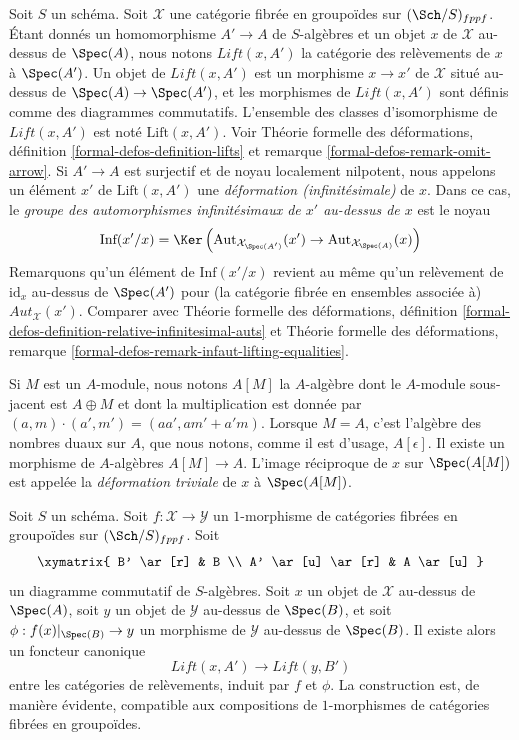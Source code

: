 \medskip\noindent
Soit $S$ un schéma. Soit $\mathcal{X}$ une catégorie fibrée en groupoïdes sur
$(\Sch/S)_{fppf}$. Étant donnés un homomorphisme $A' \to A$ de $S$-algèbres
et un objet $x$ de $\mathcal{X}$ au-dessus de $\Spec(A)$, nous notons
$\textit{Lift}(x, A')$ la catégorie des relèvements de $x$ à $\Spec(A')$.
Un objet de $\textit{Lift}(x, A')$ est un morphisme $x \to x'$ de
$\mathcal{X}$ situé au-dessus de $\Spec(A) \to \Spec(A')$, et les morphismes
de $\textit{Lift}(x, A')$ sont définis comme des diagrammes commutatifs.
L'ensemble des classes d'isomorphisme de $\textit{Lift}(x, A')$ est noté
$\text{Lift}(x, A')$. Voir Théorie formelle des déformations, définition
\ref{formal-defos-definition-lifts} et remarque
\ref{formal-defos-remark-omit-arrow}. Si $A' \to A$ est surjectif et de noyau
localement nilpotent, nous appelons un élément $x'$ de
$\text{Lift}(x, A')$ une {\it déformation (infinitésimale)} de $x$. Dans ce
cas, le {\it groupe des automorphismes infinitésimaux de $x'$ au-dessus de
$x$} est le noyau
$$
\text{Inf}(x'/x) =
\Ker\left(
\text{Aut}_{\mathcal{X}_{\Spec(A')}}(x') \to
\text{Aut}_{\mathcal{X}_{\Spec(A)}}(x)\right)
$$
Remarquons qu'un élément de $\text{Inf}(x'/x)$ revient au même qu'un relèvement
de $\text{id}_x$ au-dessus de $\Spec(A')$ pour (la catégorie fibrée en
ensembles associée à) $\mathit{Aut}_\mathcal{X}(x')$. Comparer avec Théorie
formelle des déformations, définition
\ref{formal-defos-definition-relative-infinitesimal-auts} et Théorie formelle
des déformations, remarque
\ref{formal-defos-remark-infaut-lifting-equalities}.

\medskip\noindent
Si $M$ est un $A$-module, nous notons $A[M]$ la $A$-algèbre dont le
$A$-module sous-jacent est $A \oplus M$ et dont la multiplication est donnée
par $(a, m) \cdot (a', m') = (aa', am' + a'm)$. Lorsque $M = A$, c'est
l'algèbre des nombres duaux sur $A$, que nous notons, comme il est d'usage,
$A[\epsilon]$. Il existe un morphisme de $A$-algèbres $A[M] \to A$. L'image
réciproque de $x$ sur $\Spec(A[M])$ est appelée la {\it déformation triviale}
de $x$ à $\Spec(A[M])$.

\begin{lemma}
\label{lemma-functoriality}
Soit $S$ un schéma. Soit $f : \mathcal{X} \to \mathcal{Y}$ un $1$-morphisme
de catégories fibrées en groupoïdes sur $(\Sch/S)_{fppf}$. Soit
$$
\xymatrix{
B' \ar[r] & B \\
A' \ar[u] \ar[r] & A \ar[u]
}
$$
un diagramme commutatif de $S$-algèbres. Soit $x$ un objet de $\mathcal{X}$
au-dessus de $\Spec(A)$, soit $y$ un objet de $\mathcal{Y}$ au-dessus de
$\Spec(B)$, et soit $\phi : f(x)|_{\Spec(B)} \to y$ un morphisme de
$\mathcal{Y}$ au-dessus de $\Spec(B)$. Il existe alors un foncteur canonique
$$
\textit{Lift}(x, A') \longrightarrow \textit{Lift}(y, B')
$$
entre les catégories de relèvements, induit par $f$ et $\phi$. La construction
est, de manière évidente, compatible aux compositions de $1$-morphismes de
catégories fibrées en groupoïdes.
\end{lemma}

